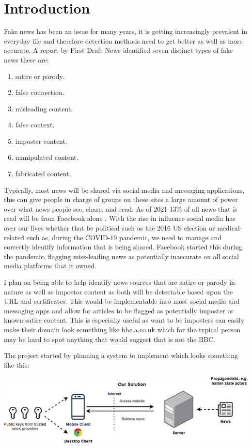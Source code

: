 \documentclass[11pt,a4paper]{report}
\begin{document}
\section{Introduction}
Fake news has been an issue for many years, it is getting increasingly prevalent in everyday life and therefore detection methods need to get better as well as more accurate. A report by First Draft News \citep{Fakenews} identified seven distinct types of fake news these are:
\begin{enumerate}
  \item satire or parody.
  \item false connection.
  \item misleading content.
  \item false context.
  \item imposter content.
  \item manipulated content.
  \item fabricated content.
\end{enumerate}
Typically, most news will be shared via social media and messaging applications, this can give people in charge of groups on these sites a large amount of power over what news people see, share, and read. As of 2021 13\% of all news that is read will be from Facebook alone \citep{Echobox}. With the rise in influence social media has over our lives whether that be political such as the 2016 US election or medical-related such as, during the COVID-19 pandemic, we need to manage and correctly identify information that is being shared. Facebook started this during the pandemic, flagging miss-leading news as potentially inaccurate on all social media platforms that it owned.

I plan on being able to help identify news sources that are satire or parody in nature as well as impostor content as both will be detectable based upon the URL and certificates. This would be implementable into most social media and messaging apps and allow for articles to be flagged as potentially imposter or known satire content. This is especially useful as want to be imposters can easily make their domain look something like bbc.a.co.uk which for the typical person may be hard to spot anything that would suggest that is not the BBC.

The project started by planning a system to implement which looks something like this:
\begin{center}
\includegraphics[width=1\textwidth]{image/diagram.png}
\end{center}
\end{document}
